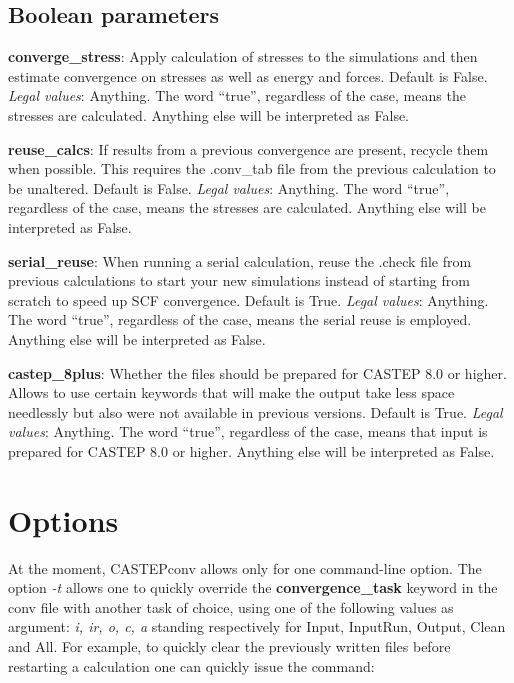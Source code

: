 \documentclass[10pt]{article}
\begin{document}
\subsection{Boolean parameters}

\textbf{converge\_stress}: Apply calculation of stresses to the simulations and 
then estimate convergence on stresses as well as energy and forces. Default is 
False.\newline
\textit{Legal values}: Anything. The word ``true'', regardless of the case, 
means the stresses are calculated. Anything else will be interpreted as 
False.\newline

\textbf{reuse\_calcs}: If results from a previous convergence are present, 
recycle them when possible. This requires the .conv\_tab file from the previous 
calculation to be unaltered. Default is False.\newline
\textit{Legal values}: Anything. The word ``true'', regardless of the case, 
means the stresses are calculated. Anything else will be interpreted as 
False.\newline

\textbf{serial\_reuse}: When running a serial calculation, reuse the .check file from previous calculations to start your new simulations instead of starting from scratch to speed up SCF convergence. Default is True.\newline
\textit{Legal values}: Anything. The word ``true'', regardless of the case, 
means the serial reuse is employed. Anything else will be interpreted as 
False.\newline

\textbf{castep\_8plus}: Whether the files should be prepared for CASTEP 8.0 or higher. Allows to use certain keywords that will make the output take less space needlessly but also were not available in previous versions. Default is True.\newline
\textit{Legal values}: Anything. The word ``true'', regardless of the case, 
means that input is prepared for CASTEP 8.0 or higher. Anything else will be interpreted as 
False.\newline

\section{Options}

At the moment, CASTEPconv allows only for one command-line option. The option \textit{-t} allows one to quickly override the \textbf{convergence\_task} keyword in the conv file with another task of choice, using one of the following values as argument: \textit{i, ir, o, c, a} standing respectively for Input, InputRun, Output, Clean and All. For example, to quickly clear the previously written files before restarting a calculation one can quickly issue the command:
\end{document}
